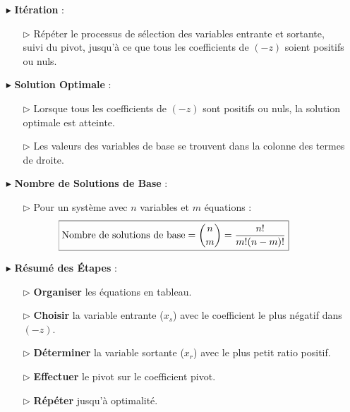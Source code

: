 \documentclass{report}
\begin{document}
\begin{multicols*}{2}
\begin{itemize}
    \item[$\blacktriangleright$] \textbf{Itération} :
    \begin{itemize}
        \item[$\rhd$] Répéter le processus de sélection des variables entrante et sortante, suivi du pivot, jusqu'à ce que tous les coefficients de $(-z)$ soient positifs ou nuls.
    \end{itemize}
    
    \item[$\blacktriangleright$] \textbf{Solution Optimale} :
    \begin{itemize}
        \item[$\rhd$] Lorsque tous les coefficients de $(-z)$ sont positifs ou nuls, la solution optimale est atteinte.
        \item[$\rhd$] Les valeurs des variables de base se trouvent dans la colonne des termes de droite.
    \end{itemize}
    
    \item[$\blacktriangleright$] \textbf{Nombre de Solutions de Base} :
\hspace{-4em}
    \begin{itemize}
        \item[$\rhd$] Pour un système avec $n$ variables et $m$ équations :
        \[
            \hspace{-2em}\boxed{\text{Nombre de solutions de base} = {n \choose m} = \dfrac{n!}{m!(n-m)!}}
        \]
    \end{itemize}
    
    \item[$\blacktriangleright$] \textbf{Résumé des Étapes} :
    \begin{enumerate}
        \item[$\rhd$] \textbf{Organiser} les équations en tableau.
        \item[$\rhd$] \textbf{Choisir} la variable entrante ($x_s$) avec le coefficient le plus négatif dans $(-z)$.
        \item[$\rhd$] \textbf{Déterminer} la variable sortante ($x_r$) avec le plus petit ratio positif.
        \item[$\rhd$] \textbf{Effectuer} le pivot sur le coefficient pivot.
        \item[$\rhd$] \textbf{Répéter} jusqu'à optimalité.
    \end{enumerate}
\end{itemize}


\end{multicols*}
\end{document}
